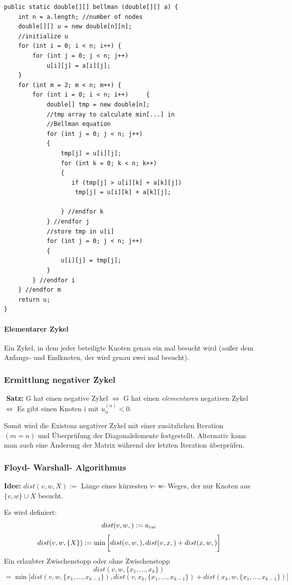 \documentclass[fleqn]{scrartcl}
\begin{document}
\begin{lstlisting}
public static double[][] bellman (double[][] a) {
	int n = a.length; //number of nodes
	double[][] u = new double[n][n];
	//initialize u
	for (int i = 0; i < n; i++)	{
		for (int j = 0; j < n; j++)
			u[i][j] = a[i][j];
	}
	for (int m = 2; m < n; m++)	{
	   	for (int i = 0; i < n; i++)		{
			double[] tmp = new double[n];
			//tmp array to calculate min[...] in 	
			//Bellman equation
			for (int j = 0; j < n; j++)
			{
				tmp[j] = u[i][j];
				for (int k = 0; k < n; k++)
				{
				   if (tmp[j] > u[i][k] + a[k][j])
					tmp[j] = u[i][k] + a[k][j];
					
				} //endfor k
			} //endfor j
			//store tmp in u[i]
			for (int j = 0; j < n; j++)
			{
				u[i][j] = tmp[j];
			}
		} //endfor i
	} //endfor m
	return u;
}
\end{lstlisting}

\paragraph*{Elementarer Zykel}
Ein Zykel, in dem jeder beteiligte Knoten genau ein mal besucht wird (außer dem Anfangs- und Endknoten, der wird genau zwei mal besucht).

\subsubsection{Ermittlung negativer Zykel} $ $
\textbf{Satz:}
G hat einen negative Zykel $\Leftrightarrow$ G hat einen \textit{elementaren} negativen Zykel $\Leftrightarrow$ Es gibt einen Knoten i mit $u_{ii}^{(n)} < 0$.

Somit wird die Existenz negativer Zykel mit einer zusätzlichen Iteration $(m = n)$ und Überprüfung der Diagonalelemente festgestellt. Alternativ kann man auch eine Änderung der Matrix während der letzten Iteration überprüfen.

\subsubsection{Floyd- Warshall- Algorithmus}
\textbf{Idee:} $dist(v, w, X) := $ Länge eines kürzesten v- w- Weges, der nur Knoten aus $\{ v, w\} \cup X$ besucht. 

Es wird definiert:
\[dist (v, w, \empty) := a_{vw}\]
\[dist (v, w, \{X\}) := \min \bigg[dist(v, w, \empty), dist (v, x, \empty) + dist (x, w, \empty) \bigg] \]
Ein erlaubter Zwischenstopp oder ohne Zwischenstopp
\[dist (v, w, \{x_1, ..., x_k \})\]
\[= \min \bigg[ dist(v, w, \{x_1, ..., x_{k-1} \}), dist(v, x_k, \{x_1, ..., x_{k-1} \} ) + dist(x_k, w, \{x_1, ..., x_{k-1}\})\bigg]\]
\end{document}
